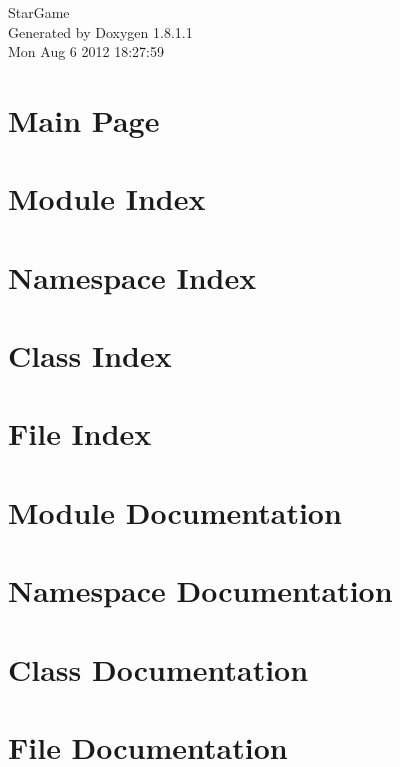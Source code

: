 \documentclass{book}
\begin{document}
\hypersetup{pageanchor=false,citecolor=blue}
\begin{titlepage}
\vspace*{7cm}
\begin{center}
{\Large Star\-Game }\\
\vspace*{1cm}
{\large Generated by Doxygen 1.8.1.1}\\
\vspace*{0.5cm}
{\small Mon Aug 6 2012 18:27:59}\\
\end{center}
\end{titlepage}
\clearemptydoublepage
{}
\tableofcontents
\clearemptydoublepage
{}
\hypersetup{pageanchor=true,citecolor=blue}
\chapter{Main Page}
\label{index}\hypertarget{index}{}
\chapter{Module Index}

\chapter{Namespace Index}

\chapter{Class Index}

\chapter{File Index}

\chapter{Module Documentation}


\chapter{Namespace Documentation}



\chapter{Class Documentation}
















\chapter{File Documentation}









\printindex
\end{document}
